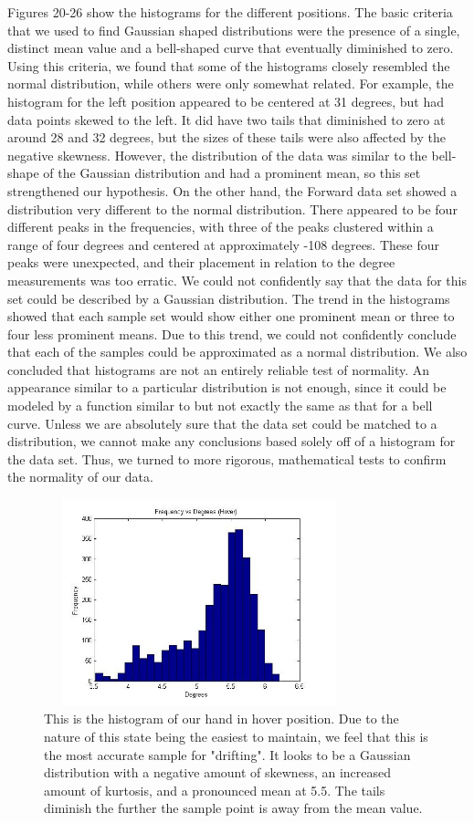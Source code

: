 \documentclass[letterpaper,english, 12pt]{article}
\begin{document}
Figures 20-26 show the histograms for the different positions. The basic criteria that we used to find Gaussian shaped distributions were the presence of a single, distinct mean value and a bell-shaped curve that eventually diminished to zero. Using this criteria, we found that some of the histograms closely resembled the normal distribution, while others were only somewhat related. For example, the histogram for the left position appeared to be centered at 31 degrees, but had data points skewed to the left. It did have two tails that diminished to zero at around 28 and 32 degrees, but the sizes of these tails were also affected by the negative skewness.  However, the distribution of the data was similar to the bell-shape of the Gaussian distribution and had a prominent mean, so this set strengthened our hypothesis. On the other hand, the Forward data set showed a distribution very different to the normal distribution. There appeared to be four different peaks in the frequencies, with three of the peaks clustered within a range of four degrees and centered at approximately -108 degrees. These four peaks were unexpected, and their placement in relation to the degree measurements was too erratic. We could not confidently say that the data for this set could be described by a Gaussian distribution. The trend in the histograms showed that each sample set would show either one prominent mean or three to four less prominent means. Due to this trend, we could not confidently conclude that each of the samples could be approximated as a normal distribution. We also concluded that histograms are not an entirely reliable test of normality. An appearance similar to a particular distribution is not enough, since it could be modeled by a function similar to but not exactly the same as that for a bell curve. Unless we are absolutely sure that the data set could be matched to a distribution, we cannot make any conclusions based solely off of a histogram for the data set. Thus, we turned to more rigorous, mathematical tests to confirm the normality of our data.

\begin{figure}[t]
	\centering
	\includegraphics[height=6cm,width=90mm]{pics/hoverHistogram1.jpg}
	\caption{This is the histogram of our hand in hover position. Due to the nature of this state being the easiest to maintain, we feel that this is the most accurate sample for "drifting". It looks to be a Gaussian distribution with a negative amount of skewness, an increased amount of kurtosis, and a pronounced mean at 5.5. The tails diminish the further the sample point is away from the mean value.}
	\centering
\end{figure}
\end{document}
